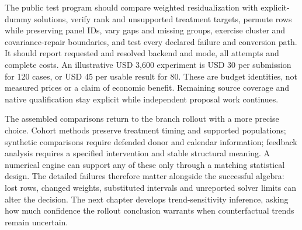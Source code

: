 The public test program should compare weighted residualization with
explicit-dummy solutions, verify rank and unsupported treatment targets,
permute rows while preserving panel IDs, vary gaps and missing groups,
exercise cluster and covariance-repair boundaries, and test every declared
failure and conversion path. It should report requested and resolved
backend and mode, all attempts and complete costs. An illustrative USD
3,600 experiment is USD 30 per submission for 120 cases, or USD 45 per
usable result for 80. These are budget identities, not measured prices
or a claim of economic benefit. Remaining source coverage and native
qualification stay explicit while independent proposal work continues.
\citep{exec25_panelcxx_reference}

The assembled comparisons return to the branch rollout with a more precise
choice. Cohort methods preserve treatment timing and supported populations;
synthetic comparisons require defended donor and calendar information;
feedback analysis requires a specified intervention and stable structural
meaning. A numerical engine can support any of these only through a matching
statistical design. The detailed failures therefore matter alongside the
successful algebra: lost rows, changed weights, substituted intervals and
unreported solver limits can alter the decision. The next chapter develops
trend-sensitivity inference, asking how much confidence the rollout conclusion
warrants when counterfactual trends remain uncertain.


